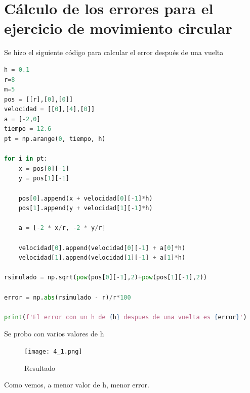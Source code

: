 \documentclass{article}
\begin{document}
\section{Cálculo de los errores para el ejercicio de movimiento circular}
Se hizo el siguiente código para calcular el error después de una vuelta
\begin{lstlisting}[language=Python,caption=Desafío 1.1]
h = 0.1
r=8
m=5
pos = [[r],[0],[0]]
velocidad = [[0],[4],[0]]
a = [-2,0]
tiempo = 12.6
pt = np.arange(0, tiempo, h)

for i in pt:
    x = pos[0][-1]
    y = pos[1][-1]

    pos[0].append(x + velocidad[0][-1]*h)
    pos[1].append(y + velocidad[1][-1]*h)

    a = [-2 * x/r, -2 * y/r]

    velocidad[0].append(velocidad[0][-1] + a[0]*h)
    velocidad[1].append(velocidad[1][-1] + a[1]*h)

rsimulado = np.sqrt(pow(pos[0][-1],2)+pow(pos[1][-1],2))

error = np.abs(rsimulado - r)/r*100

print(f'El error con un h de {h} despues de una vuelta es {error}')
\end{lstlisting}
Se probo con varios valores de h
\begin{figure}[H]
    \centering
    \texttt{[image: 4\_1.png]}
    \caption{Resultado}
\end{figure}
Como vemos, a menor valor de h, menor error.
\end{document}
